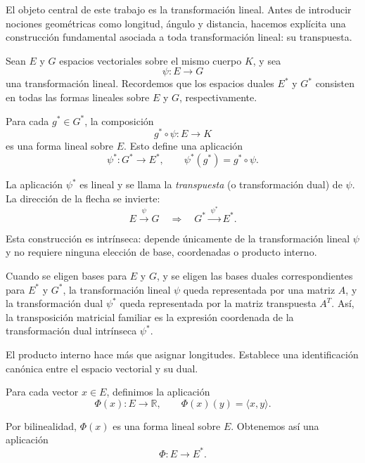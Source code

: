 \medskip

El objeto central de este trabajo es la transformación lineal. Antes de
introducir nociones geométricas como longitud, ángulo y distancia, hacemos
explícita una construcción fundamental asociada a toda transformación lineal:
su transpuesta.

\medskip

Sean $E$ y $G$ espacios vectoriales sobre el mismo cuerpo $K$, y sea
\[
\psi : E \longrightarrow G
\]
una transformación lineal. Recordemos que los espacios duales $E^*$ y $G^*$
consisten en todas las formas lineales sobre $E$ y $G$, respectivamente.

\medskip

Para cada $g^* \in G^*$, la composición
\[
g^* \circ \psi : E \longrightarrow K
\]
es una forma lineal sobre $E$. Esto define una aplicación
\[
\psi^* : G^* \longrightarrow E^*,
\qquad
\psi^*(g^*) = g^* \circ \psi.
\]

\medskip

La aplicación $\psi^*$ es lineal y se llama la \emph{transpuesta}
(o transformación dual) de $\psi$. La dirección de la flecha se invierte:
\[
E \xrightarrow{\;\psi\;} G
\quad\Longrightarrow\quad
G^* \xrightarrow{\;\psi^*\;} E^*.
\]

\medskip

Esta construcción es intrínseca: depende únicamente de la transformación
lineal $\psi$ y no requiere ninguna elección de base, coordenadas o producto interno.

\medskip

Cuando se eligen bases para $E$ y $G$, y se eligen las bases duales
correspondientes para $E^*$ y $G^*$, la transformación lineal $\psi$ queda
representada por una matriz $A$, y la transformación dual $\psi^*$ queda
representada por la matriz transpuesta $A^T$.
Así, la transposición matricial familiar es la expresión coordenada de la
transformación dual intrínseca $\psi^*$.

\medskip

El producto interno hace más que asignar longitudes.
Establece una identificación canónica entre el espacio vectorial y su dual.

\medskip

Para cada vector $x \in E$, definimos la aplicación
\[
\Phi(x) : E \longrightarrow \mathbb{R},
\qquad
\Phi(x)(y) = \langle x,y \rangle.
\]

Por bilinealidad, $\Phi(x)$ es una forma lineal sobre $E$.
Obtenemos así una aplicación
\[
\Phi : E \longrightarrow E^*.
\]

